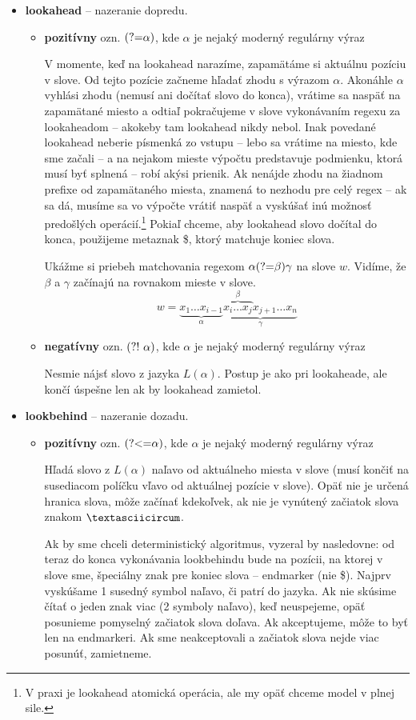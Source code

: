\begin{itemize}
\item \textbf{lookahead} -- nazeranie dopredu.
\begin{itemize}
\item \textbf{pozitívny} ozn. $\text{(?=}\alpha)$, kde $\alpha$ je nejaký moderný regulárny výraz 

V momente, keď na lookahead narazíme, zapamätáme si aktuálnu pozíciu v slove. Od tejto pozície začneme hľadať zhodu s výrazom $\alpha$. Akonáhle $\alpha$ vyhlási zhodu (nemusí ani dočítať slovo do konca), vrátime sa naspäť na zapamätané miesto a odtiaľ pokračujeme v slove vykonávaním regexu za look\-aheadom -- akokeby tam lookahead nikdy nebol. Inak povedané look\-ahead neberie písmenká zo vstupu -- lebo sa vrátime na miesto, kde sme začali -- a na nejakom mieste výpočtu predstavuje podmienku, ktorá musí byť splnená -- robí akýsi prienik. Ak nenájde zhodu na žiadnom prefixe od zapamätaného miesta, znamená to nezhodu pre celý regex -- ak sa dá, musíme sa vo výpočte vrátiť naspäť a vyskúšať inú možnosť predošlých operácií.\footnote{V praxi je lookahead atomická operácia, ale my opäť chceme model v plnej sile.} Pokiaľ chceme, aby lookahead slovo dočítal do konca, použijeme metaznak \$, ktorý matchuje koniec slova.

Ukážme si priebeh matchovania regexom $\alpha\text{(?=}\beta)\gamma$ na slove $w$. Vidíme, že $\beta$ a $\gamma$ začínajú na rovnakom mieste v slove.
 $$w = \underbrace{x_1\dots x_{i-1}}_\alpha \underbrace{\overbrace{x_i \dots x_j}^\beta x_{j+1} \dots x_n }_\gamma$$ 
\item \textbf{negatívny} ozn. $\text{(?!~}\alpha)$, kde $\alpha$ je nejaký moderný regulárny výraz  

Nesmie nájsť slovo z jazyka $L(\alpha)$. Postup je ako pri lookaheade, ale končí úspešne len ak by lookahead zamietol.
\end{itemize}
\item \textbf{lookbehind} -- nazeranie dozadu.
\begin{itemize}
\item \textbf{pozitívny} ozn. $\text{(?\textless =}\alpha)$, kde $\alpha$ je nejaký moderný regulárny výraz 

Hľadá slovo z $L(\alpha)$ naľavo od aktuálneho miesta v slove (musí končiť na susediacom políčku vľavo od aktuálnej pozície v slove). Opäť nie je určená hranica slova, môže začínať kdekoľvek, ak nie je vynútený začiatok slova znakom $\textasciicircum$. 

Ak by sme chceli deterministický algoritmus, vyzeral by nasledovne: od teraz do konca vykonávania lookbehindu bude na pozícii, na ktorej v slove sme, špeciálny znak pre koniec slova -- endmarker (nie \$). Najprv vyskúšame 1 susedný symbol naľavo, či patrí do jazyka. Ak nie skúsime čítať o jeden znak viac (2 symboly naľavo), keď neuspejeme, opäť posunieme pomyselný začiatok slova doľava. Ak akceptujeme, môže to byť len na endmarkeri. Ak sme neakceptovali a začiatok slova nejde viac posunúť, zamietneme.


\end{itemize}
\end{itemize}
